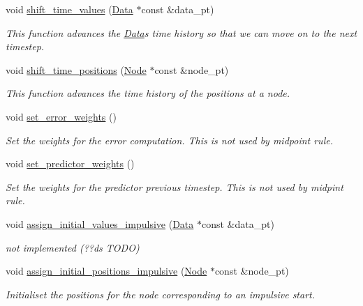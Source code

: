 \begin{DoxyCompactItemize}
void \hyperlink{classoomph_1_1IMRBase_a34c72011189de014a69288fbcfac54f4}{shift\+\_\+time\+\_\+values} (\hyperlink{classoomph_1_1Data}{Data} $\ast$const \&data\+\_\+pt)
\begin{DoxyCompactList}\small\item\em This function advances the \hyperlink{classoomph_1_1Data}{Data}\textquotesingle{}s time history so that we can move on to the next timestep. \end{DoxyCompactList}\item 
void \hyperlink{classoomph_1_1IMRBase_a61d4487fcf0a9eb7a829b08027a9500f}{shift\+\_\+time\+\_\+positions} (\hyperlink{classoomph_1_1Node}{Node} $\ast$const \&node\+\_\+pt)
\begin{DoxyCompactList}\small\item\em This function advances the time history of the positions at a node. \end{DoxyCompactList}\item 
void \hyperlink{classoomph_1_1IMRBase_a8122f3fa05e8622db6a98072d88685e2}{set\+\_\+error\+\_\+weights} ()
\begin{DoxyCompactList}\small\item\em Set the weights for the error computation. This is not used by midpoint rule. \end{DoxyCompactList}\item 
void \hyperlink{classoomph_1_1IMRBase_a68771c915a13f5a3e3655fff12cb73a3}{set\+\_\+predictor\+\_\+weights} ()
\begin{DoxyCompactList}\small\item\em Set the weights for the predictor previous timestep. This is not used by midpint rule. \end{DoxyCompactList}\item 
void \hyperlink{classoomph_1_1IMRBase_a2de3063187cd9d18db4cd36c36806f2f}{assign\+\_\+initial\+\_\+values\+\_\+impulsive} (\hyperlink{classoomph_1_1Data}{Data} $\ast$const \&data\+\_\+pt)
\begin{DoxyCompactList}\small\item\em not implemented (??ds T\+O\+DO) \end{DoxyCompactList}\item 
void \hyperlink{classoomph_1_1IMRBase_ae9c3433ed870a32d2f94f7aa7b39104e}{assign\+\_\+initial\+\_\+positions\+\_\+impulsive} (\hyperlink{classoomph_1_1Node}{Node} $\ast$const \&node\+\_\+pt)
\begin{DoxyCompactList}\small\item\em Initialiset the positions for the node corresponding to an impulsive start. \end{DoxyCompactList}\item 

\end{DoxyCompactItemize}
